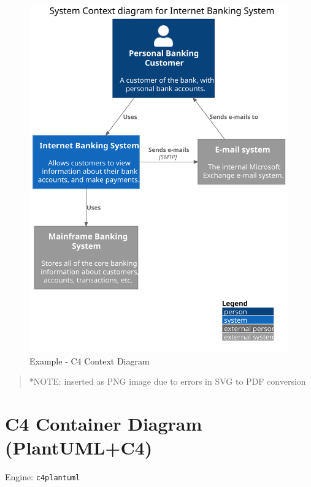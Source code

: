 \documentclass[
  12pt,
  a4paper,
  12pt,
  oneside,
  openany]{book}
\begin{document}
\begin{figure}

{\centering \includegraphics[height=15cm]{generated/diagrams-examples-c4plantuml-context-Rmd} 

}

\caption{Example - C4 Context Diagram}\label{fig:examples-c4context}
\end{figure}

\begin{quote}
*NOTE: inserted as PNG image due to errors in SVG to PDF conversion
\end{quote}

\newpage

\hypertarget{kroki-c4container}{%
\section{C4 Container Diagram (PlantUML+C4)}\label{kroki-c4container}}

Engine: \texttt{c4plantuml}
\end{document}
